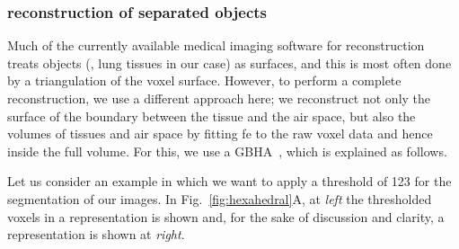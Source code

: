 \subsubsection{\threed reconstruction of separated objects}
Much of the currently available medical imaging software for \threed reconstruction treats objects (\ie, lung tissues in our case) as surfaces, and this is most often done by a triangulation of the voxel surface. However, to perform a complete \threed reconstruction, we use a different approach here; we reconstruct not only the surface of the boundary between the tissue and the air space, but also the volumes of tissues and air space by fitting \ac{fe} to the raw voxel data and hence inside the full volume. For this, we use a \ac{GBHA}~\cite{Schneiders1996}, which is explained as follows.

Let us consider an example in which we want to apply a threshold of 123 for the segmentation of our images. In Fig.~\ref{fig:hexahedral}A, at \textit{left} the thresholded voxels in a \threed representation is shown and, for the sake of discussion and clarity, a \twod representation is shown at \textit{right}.
